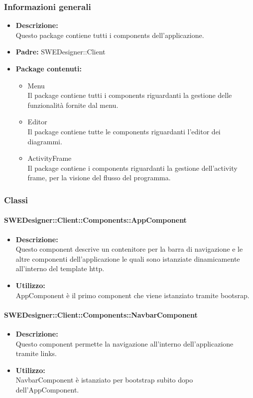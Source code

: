 		\subsubsection{Informazioni generali}
			\begin{itemize}
          		\item \textbf{Descrizione:}\\
          		Questo package contiene tutti i components dell’applicazione.
          		\item \textbf{Padre:} SWEDesigner::Client
          		\item \textbf{Package contenuti:}\\
          		\begin{itemize}
          			\item Menu\\
          			Il package contiene tutti i components riguardanti la gestione delle funzionalità fornite dal menu.
          			\item Editor\\
          			Il package contiene tutte le components riguardanti l’editor dei diagrammi.
          			\item ActivityFrame\\
          			Il package contiene i components riguardanti la gestione dell’activity frame, per la visione del flusso del programma.
          		\end{itemize}
          	\end{itemize}
		\subsubsection{Classi}
			\paragraph{SWEDesigner::Client::Components::AppComponent}
				\begin{itemize}
          			\item \textbf{Descrizione:}\\
          			Questo component descrive un contenitore per la barra di navigazione e le altre componenti dell’applicazione le quali sono istanziate dinamicamente all’interno del template http.
          			\item \textbf{Utilizzo:}\\
          			AppComponent è il primo component che viene istanziato tramite bootsrap.
          		\end{itemize}
			\paragraph{SWEDesigner::Client::Components::NavbarComponent}
				\begin{itemize}
          			\item \textbf{Descrizione:}\\
          			Questo component permette la navigazione all’interno dell’applicazione tramite links.
          			\item \textbf{Utilizzo:}\\
          			NavbarComponent è istanziato per bootstrap subito dopo dell’AppComponent.
          		\end{itemize}
